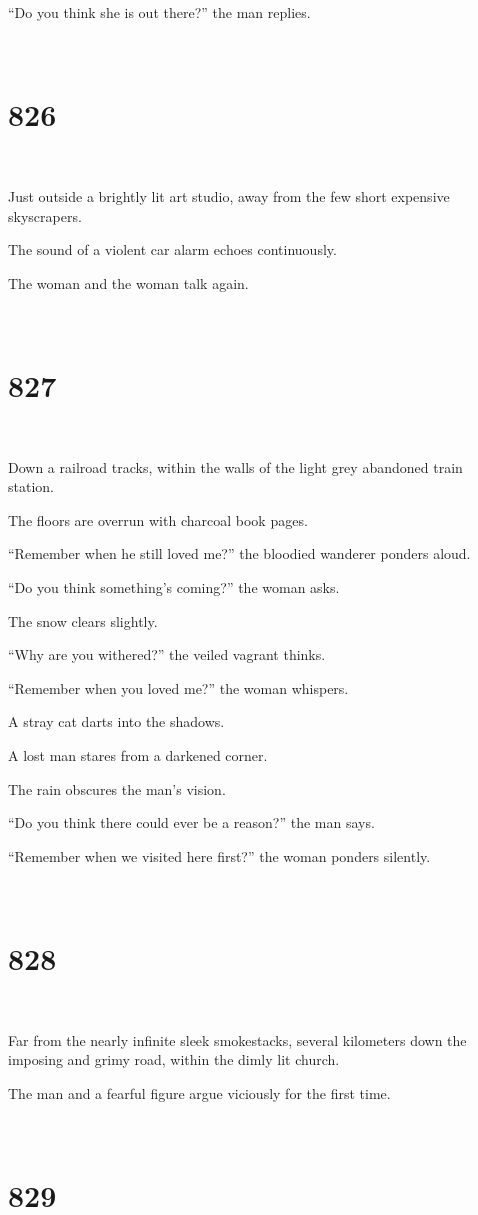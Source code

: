 \documentclass{report}
\begin{document}
``Do you think she is out there?'' the man replies.

~
\chapter*{826}
~

Just outside a brightly lit art studio, away from the few short expensive skyscrapers.

The sound of a violent car alarm echoes continuously.

The woman and the woman talk again.

~
\chapter*{827}
~

Down a railroad tracks, within the walls of the light grey abandoned train station.

The floors are overrun with charcoal book pages.

``Remember when he still loved me?'' the bloodied wanderer ponders aloud.

``Do you think something's coming?'' the woman asks.

The snow clears slightly.

``Why are you withered?'' the veiled vagrant thinks.

``Remember when you loved me?'' the woman whispers.

A stray cat darts into the shadows.

A lost man stares from a darkened corner.

The rain obscures the man's vision.

``Do you think there could ever be a reason?'' the man says.

``Remember when we visited here first?'' the woman ponders silently.

~
\chapter*{828}
~

Far from the nearly infinite sleek smokestacks, several kilometers down the imposing and grimy road, within the dimly lit church.

The man and a fearful figure argue viciously for the first time.

~
\chapter*{829}
~
\end{document}
